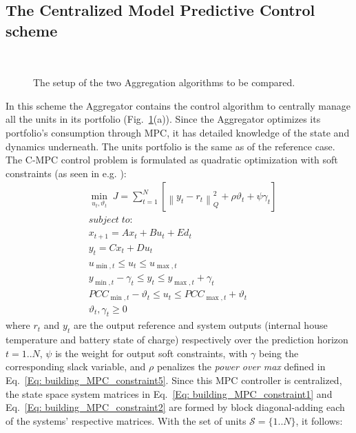 \subsection{The Centralized Model Predictive Control scheme}
\begin{figure}[t]  
	\centering
\\
\caption{The setup of the two Aggregation algorithms to be compared.}\label{fig:systemsetup}
\end{figure}
In this scheme the Aggregator contains the control algorithm to centrally manage all the units in its portfolio (Fig.~\ref{fig:systemsetup}(a)). Since the Aggregator optimizes its portfolio's consumption through MPC, it has detailed knowledge of the state and dynamics underneath.
The units portfolio is the same as of the reference case. The C-MPC control problem is formulated as quadratic optimization with soft constraints (as seen in e.g. \cite{prasath2009a}):
{%
{\begin{subequations}\label{Eq: building_MPC}
\begin{align}
& \min\limits_{u_t,\vartheta_t} \; {J} = \sum\limits_{t = 1}^N {\left[ {\left\| {y_{t} - r_t} \right\|_Q^2} + {\rho}\vartheta_t + \psi \gamma_t \right]} \label{Eq: building_MPC_objective}\\
& subject \; to: \nonumber \\
& x_{t + 1} = Ax_t + B u_t + Ed_t\label{Eq: building_MPC_constraint1}\\
& y_t = {C}x_t +Du_t \label{Eq: building_MPC_constraint2}\\
& u_{\min ,t} \le u_t \le u_{\max ,t} \label{Eq: building_MPC_constraint3}\\
& y_{\min ,t} - \gamma_t \le y_{t} \le y_{\max ,t} + \gamma_t \label{Eq: building_MPC_constraint4}\\
& {PCC_{\min ,t}} - \vartheta _t \le u_t \le {PCC_{\max ,t}} + \vartheta _t \label{Eq: building_MPC_constraint5}\\
& \vartheta_t,\gamma_t \ge 0 \label{Eq: building_MPC_constraint6}
\end{align}
\end{subequations}}}
where $r_t$ and $y_t$ are the output reference and system outputs (internal house temperature and battery state of charge) respectively over the prediction horizon $t=1..N$, $\psi$ is the weight for output soft constraints, with $\gamma$ being the corresponding slack variable, and $\rho$ penalizes the \emph{power over max} defined in Eq.~\ref{Eq: building_MPC_constraint5}. Since this MPC controller is centralized, the state space system matrices in Eq.~\eqref{Eq: building_MPC_constraint1} and Eq.~\eqref{Eq: building_MPC_constraint2} are formed by block diagonal-adding each of the systems' respective matrices. With the set of units $\mathcal{S}=\{1..N\}$, it follows:
